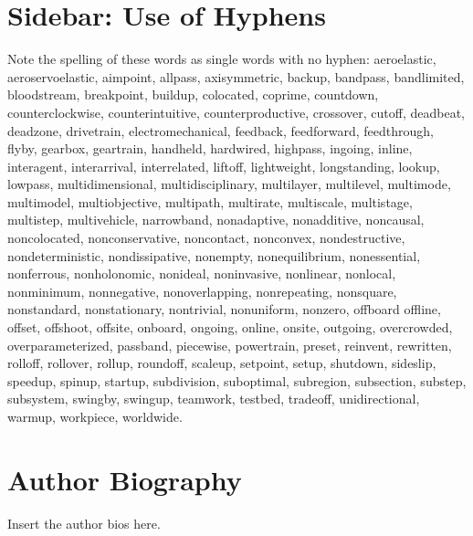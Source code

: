 \documentclass[letterpaper,12pt,peerreviewca,draftcls]{IEEEtran}
\begin{document}
\clearpage
\section[Use of Hyphens]{Sidebar: Use of Hyphens}
\label{sb:UseofHyphens}
       			
Note the spelling of these words as single words with no hyphen:  aeroelastic, aeroservoelastic, aimpoint, allpass, axisymmetric, backup, bandpass, bandlimited, bloodstream, breakpoint, buildup, colocated, coprime, countdown, counterclockwise, counterintuitive, counterproductive, crossover, cutoff, deadbeat, deadzone, drivetrain, electromechanical, feedback, feedforward, feedthrough, flyby, gearbox, geartrain, handheld, hardwired, highpass, ingoing, inline, interagent, interarrival, interrelated, liftoff, lightweight, longstanding, lookup, lowpass, multidimensional, multidisciplinary, multilayer, multilevel, multimode, multimodel, multiobjective, multipath, multirate, multiscale, multistage, multistep, multivehicle, narrowband, nonadaptive, nonadditive, noncausal, noncolocated, nonconservative, noncontact, nonconvex, nondestructive, nondeterministic, nondissipative, nonempty, nonequilibrium, nonessential, nonferrous, nonholonomic, nonideal, noninvasive, nonlinear, nonlocal, nonminimum, nonnegative, nonoverlapping, nonrepeating, nonsquare, nonstandard, nonstationary, nontrivial, nonuniform, nonzero, offboard offline, offset, offshoot, offsite, onboard, ongoing, online, onsite, outgoing, overcrowded, overparameterized, passband, piecewise, powertrain, preset, reinvent, rewritten, rolloff, rollover, rollup, roundoff, scaleup, setpoint, setup, shutdown, sideslip, speedup, spinup, startup, subdivision, suboptimal, subregion, subsection, substep, subsystem, swingby, swingup, teamwork, testbed, tradeoff, unidirectional, warmup, workpiece, worldwide.
       	
%

\newpage
\section{Author Biography}
Insert the author bios here.
%
\end{document}
